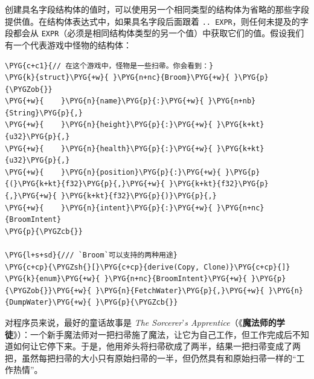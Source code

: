 创建具名字段结构体的值时，可以使用另一个相同类型的结构体为省略的那些字段提供值。在结构体表达式中，如果具名字段后面跟着 \texttt{.. EXPR}，则任何未提及的字段都会从 \texttt{EXPR}（必须是相同结构体类型的另一个值）中获取它们的值。假设我们有一个代表游戏中怪物的结构体：

\begin{Verbatim}[commandchars=\\\{\},breaklines=true,breakanywhere=true,fontsize=\codefont,xleftmargin=17bp]
\PYG{c+c1}{// 在这个游戏中，怪物是一些扫帚。你会看到：}
\PYG{k}{struct}\PYG{+w}{ }\PYG{n+nc}{Broom}\PYG{+w}{ }\PYG{p}{\PYGZob{}}
\PYG{+w}{    }\PYG{n}{name}\PYG{p}{:}\PYG{+w}{ }\PYG{n+nb}{String}\PYG{p}{,}
\PYG{+w}{    }\PYG{n}{height}\PYG{p}{:}\PYG{+w}{ }\PYG{k+kt}{u32}\PYG{p}{,}
\PYG{+w}{    }\PYG{n}{health}\PYG{p}{:}\PYG{+w}{ }\PYG{k+kt}{u32}\PYG{p}{,}
\PYG{+w}{    }\PYG{n}{position}\PYG{p}{:}\PYG{+w}{ }\PYG{p}{(}\PYG{k+kt}{f32}\PYG{p}{,}\PYG{+w}{ }\PYG{k+kt}{f32}\PYG{p}{,}\PYG{+w}{ }\PYG{k+kt}{f32}\PYG{p}{)}\PYG{p}{,}
\PYG{+w}{    }\PYG{n}{intent}\PYG{p}{:}\PYG{+w}{ }\PYG{n+nc}{BroomIntent}
\PYG{p}{\PYGZcb{}}

\PYG{l+s+sd}{/// `Broom`可以支持的两种用途}
\PYG{c+cp}{\PYGZsh{}[}\PYG{c+cp}{derive(Copy, Clone)}\PYG{c+cp}{]}
\PYG{k}{enum}\PYG{+w}{ }\PYG{n+nc}{BroomIntent}\PYG{+w}{ }\PYG{p}{\PYGZob{}}\PYG{+w}{ }\PYG{n}{FetchWater}\PYG{p}{,}\PYG{+w}{ }\PYG{n}{DumpWater}\PYG{+w}{ }\PYG{p}{\PYGZcb{}}
\end{Verbatim}

对程序员来说，最好的童话故事是 \emph{The Sorcerer}'\emph{s Apprentice}（《\textbf{魔法师的学徒}》）：一个新手魔法师对一把扫帚施了魔法，让它为自己工作，但工作完成后不知道如何让它停下来。于是，他用斧头将扫帚砍成了两半，结果一把扫帚变成了两把，虽然每把扫帚的大小只有原始扫帚的一半，但仍然具有和原始扫帚一样的“工作热情”。

